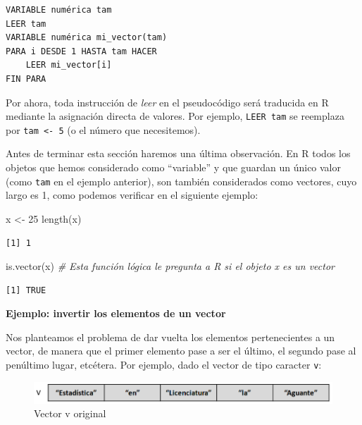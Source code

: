 \documentclass[
]{book}
\newenvironment{Shaded}{\begin{snugshade}}{\end{snugshade}}
\newcommand{\CommentTok}[1]{\textcolor[rgb]{0.56,0.35,0.01}{\textit{#1}}}
\newcommand{\DecValTok}[1]{\textcolor[rgb]{0.00,0.00,0.81}{#1}}
\newcommand{\FunctionTok}[1]{\textcolor[rgb]{0.00,0.00,0.00}{#1}}
\newcommand{\NormalTok}[1]{#1}
\newcommand{\OtherTok}[1]{\textcolor[rgb]{0.56,0.35,0.01}{#1}}
\begin{document}
\begin{verbatim}
VARIABLE numérica tam
LEER tam
VARIABLE numérica mi_vector(tam)
PARA i DESDE 1 HASTA tam HACER
    LEER mi_vector[i]
FIN PARA
\end{verbatim}

Por ahora, toda instrucción de \emph{leer} en el pseudocódigo será traducida en R mediante la asignación directa de valores. Por ejemplo, \texttt{LEER\ tam} se reemplaza por \texttt{tam\ \textless{}-\ 5} (o el número que necesitemos).

Antes de terminar esta sección haremos una última observación. En R todos los objetos que hemos considerado como ``variable'' y que guardan un único valor (como \texttt{tam} en el ejemplo anterior), son también considerados como vectores, cuyo largo es 1, como podemos verificar en el siguiente ejemplo:

\begin{Shaded}
\begin{Highlighting}[]
\NormalTok{x }\OtherTok{\textless{}{-}} \DecValTok{25}
\FunctionTok{length}\NormalTok{(x)}
\end{Highlighting}
\end{Shaded}

\begin{verbatim}
[1] 1
\end{verbatim}

\begin{Shaded}
\begin{Highlighting}[]
\FunctionTok{is.vector}\NormalTok{(x) }\CommentTok{\# Esta función lógica le pregunta a R si el objeto x es un vector}
\end{Highlighting}
\end{Shaded}

\begin{verbatim}
[1] TRUE
\end{verbatim}

\textbf{Ejemplo: invertir los elementos de un vector}

Nos planteamos el problema de dar vuelta los elementos pertenecientes a un vector, de manera que el primer elemento pase a ser el último, el segundo pase al penúltimo lugar, etcétera. Por ejemplo, dado el vector de tipo caracter \texttt{v}:

\begin{figure}

{\centering \includegraphics[width=0.8\linewidth]{images/05_estructuras/estr11} 

}

\caption{Vector v original}\label{fig:inv1}
\end{figure}
\end{document}
